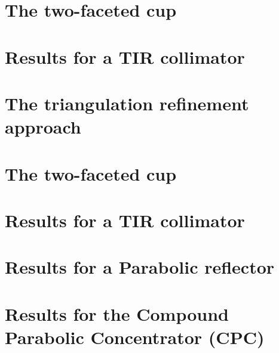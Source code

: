 \section{The two-faceted cup}
\section{Results for a TIR collimator}
\section{The triangulation refinement approach}
\section{The two-faceted cup}
\section{Results for a TIR collimator}
\section{Results for a Parabolic reflector}
\section{Results for the Compound Parabolic Concentrator (CPC)}
